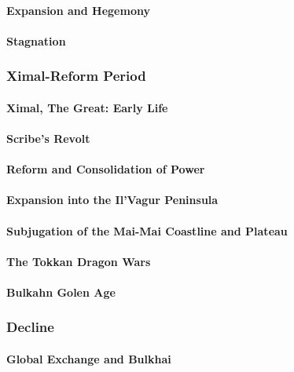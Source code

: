 		\paragraph{Expansion and Hegemony}
		\paragraph{Stagnation}
	\subsubsection{Ximal-Reform Period}
		\paragraph{Ximal, The Great: Early Life}
		\paragraph{Scribe's Revolt}
		\paragraph{Reform and Consolidation of Power}
		\paragraph{Expansion into the Il'Vagur Peninsula}
		\paragraph{Subjugation of the Mai-Mai Coastline and Plateau}
		\paragraph{The Tokkan Dragon Wars}
		\paragraph{Bulkahn Golen Age}
	\subsubsection{Decline}
		\paragraph{Global Exchange and Bulkhai}
				